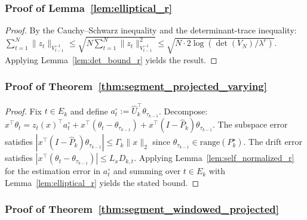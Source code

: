 \documentclass{article}
\newcommand{\range}{\mathrm{range}}
\begin{document}
\subsubsection{Proof of Lemma~\ref{lem:elliptical_r}}
\label{proof:elliptical_r}

\begin{proof}
By the Cauchy--Schwarz inequality and the determinant-trace inequality:
$\sum_{t=1}^N \|z_t\|_{V_{t-1}^{-1}} \le \sqrt{N \sum_{t=1}^N \|z_t\|_{V_{t-1}^{-1}}^2} \le \sqrt{N \cdot 2\log(\det(V_N)/\lambda^r)}$.
Applying Lemma~\ref{lem:det_bound_r} yields the result.
\end{proof}

\subsubsection{Proof of Theorem~\ref{thm:segment_projected_varying}}
\label{proof:segment_projected_varying}

\begin{proof}
Fix $t\in E_k$ and define $a_t^\circ := \widehat U_k^\top \theta_{\tau_{k-1}}$.
Decompose:
$x^\top \theta_t = z_t(x)^\top a_t^\circ + x^\top(\theta_t-\theta_{\tau_{k-1}}) + x^\top(I-\widehat P_k)\theta_{\tau_{k-1}}$.
The subspace error satisfies $|x^\top(I-\widehat P_k)\theta_{\tau_{k-1}}| \le \Gamma_k\|x\|_2$ since $\theta_{\tau_{k-1}} \in \range(P_k^\star)$.
The drift error satisfies $|x^\top(\theta_t-\theta_{\tau_{k-1}})| \le L_x D_{k,t}$.
Applying Lemma~\ref{lem:self_normalized_r} for the estimation error in $a_t^\circ$ and summing over $t \in E_k$ with Lemma~\ref{lem:elliptical_r} yields the stated bound.
\end{proof}

\subsubsection{Proof of Theorem~\ref{thm:segment_windowed_projected}}
\label{proof:segment_windowed_projected}
\end{document}
